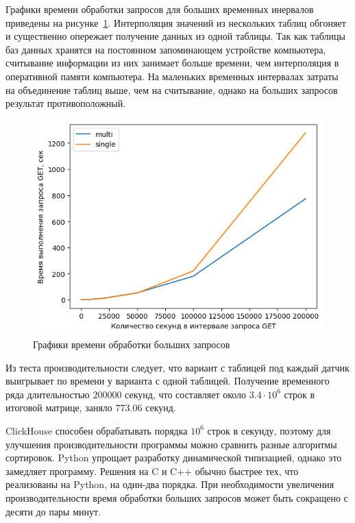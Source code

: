Графики времени обработки запросов для больших временных инервалов приведены на рисунке~\ref{bench2e5}. Интерполяция значений из нескольких таблиц обгоняет и существенно опережает получение данных из одной таблицы. Так как таблицы баз данных хранятся на постоянном запоминающем устройстве компьютера, считывание информации из них занимает больше времени, чем интерполяция в оперативной памяти компьютера. На маленьких временных интервалах затраты на объединение таблиц выше, чем на считывание, однако на больших запросов результат противоположный.

\begin{figure}
    \includegraphics[scale=1.0]{img/bench2e5.png}
    \caption{Графики времени обработки больших запросов}
    \label{bench2e5}
\end{figure}

Из теста производительности следует, что вариант с таблицей под каждый датчик выигрывает по времени у варианта с одной таблицей. Получение временного ряда длительностью $200000$ секунд, что составляет около $3.4 \cdot {10} ^ {6}$ строк в итоговой матрице, заняло $773.06$ секунд.

ClickHouse способен обрабатывать порядка ${10} ^ {6}$ строк в секунду, поэтому для улучшения производительности программы можно сравнить разные алгоритмы сортировок. Python упрощает разработку динамической типизацией, однако это замедляет программу. Решения на C и C++ обычно быстрее тех, что реализованы на Python, на один-два порядка. При необходимости увеличения производительности время обработки больших запросов может быть сокращено с десяти до пары минут.
